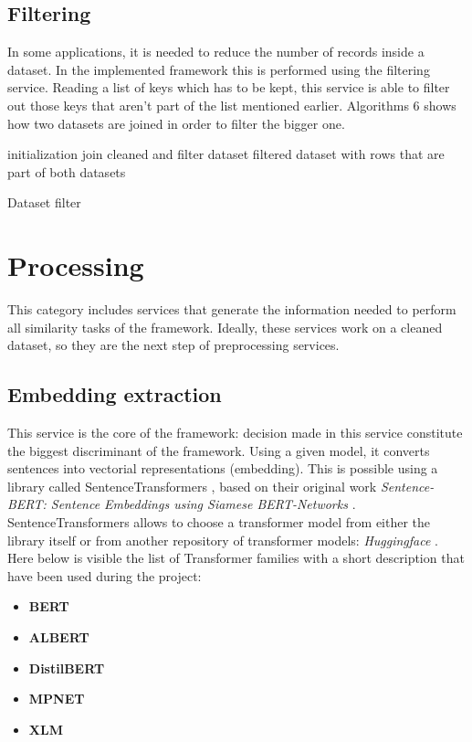 \documentclass[\main/main.tex]{subfiles}
\begin{document}
\subsection{Filtering}
In some applications, it is needed to reduce the number of records inside a dataset. In the implemented framework this is performed using the filtering service. Reading a list of keys which has to be kept, this service is able to filter out those keys that aren't part of the list mentioned earlier. Algorithms 6 shows how two datasets are joined in order to filter the bigger one.
\begin{center}
    \begin{algorithm}[H]
     initialization
     join cleaned and filter dataset
     \Return filtered dataset with rows that are part of both datasets
     \caption{Dataset filter}
    \end{algorithm}
\end{center}

\section{Processing}
This category includes services that generate the information needed to perform all similarity tasks of the framework. Ideally, these services work on a cleaned dataset, so they are the next step of preprocessing services. 
\subsection{Embedding extraction}
This service is the core of the framework: decision made in this service constitute the biggest discriminant of the framework. Using a given model, it converts sentences into vectorial representations (embedding). This is possible using a library called SentenceTransformers \cite{sbert}, based on their original work \emph{Sentence-BERT: Sentence Embeddings using Siamese BERT-Networks} \cite{reimers2019sentencebert}. SentenceTransformers allows to choose a transformer model from either the library itself or from another repository of transformer models: \emph{Huggingface} \cite{huggingface}. Here below is visible the list of Transformer families with a short description that have been used during the project:
\begin{itemize}
    \item \textbf{BERT}
    \item \textbf{ALBERT}
    \item \textbf{DistilBERT}
    \item \textbf{MPNET}
    \item \textbf{XLM}
\end{itemize} 
\end{document}
